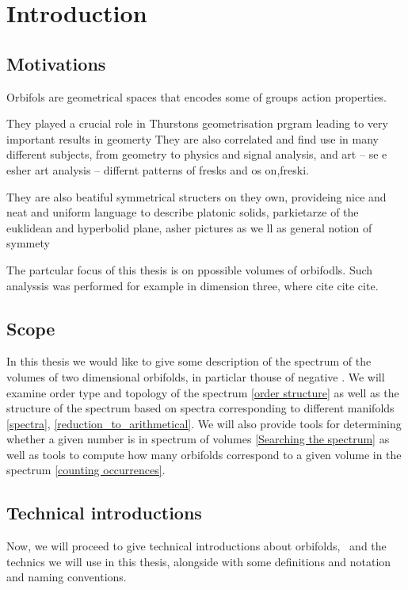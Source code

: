 \chapter{Introduction}
\setcounter{page}{9}
\section{Motivations}
Orbifols are geometrical spaces that encodes some of groups action properties. 

They played a crucial role in Thurstons geometrisation prgram leading to very important 
results in geomerty
They are also correlated and find use in many different subjects, 
from geometry to physics and signal analysis, and art -- se e esher art analysis -- 
differnt patterns of fresks and os on,freski.

They are also beatiful symmetrical structers on they own, provideing 
nice and neat  and uniform language to describe platonic solids, parkietarze of the euklidean 
and hyperbolid plane, asher pictures 
as we ll as general notion of symmety


The partcular focus of this thesis is on ppossible volumes of orbifodls.
Such analyssis was performed for example in dimension three, where 
cite cite cite.


\section{Scope}
In this thesis we would like to give some description of the spectrum of the volumes 
of two dimensional orbifolds, in particlar thouse of negative \Eoc. 
We will examine order type and topology of the spectrum \ref{order structure} 
as well as the structure 
of the spectrum based on spectra corresponding to different manifolds \ref{spectra}, 
\ref{reduction_to_arithmetical}.
We will also provide tools for determining whether a given number is in spectrum of volumes 
\ref{Searching the spectrum} as 
well as tools to compute how many orbifolds correspond to a given volume in the spectrum 
\ref{counting occurrences}. 

\section{Technical introductions}
Now, we will proceed to give technical introductions about orbifolds, \Eoc\ and the 
technics we will use in this thesis, alongside with some definitions and notation and 
naming conventions. 
 
